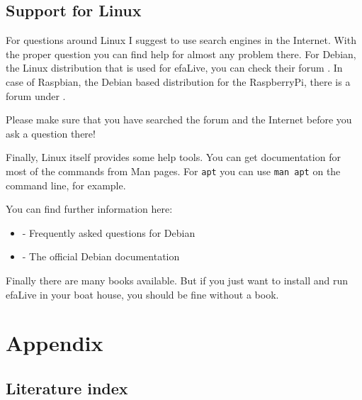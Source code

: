 \documentclass[a4paper,12pt,twoside]{article}
\begin{document}
\subsection{Support for Linux}
\label{support_linux}
For questions around Linux I suggest to use search engines in the
Internet. With the proper question you can find help for almost any
problem there. For Debian, the Linux distribution that is used for
efaLive, you can check their forum \cite{HLP1}. In case of Raspbian, 
the Debian based distribution for the RaspberryPi, there is a forum 
under \cite{RSP1}.

Please make sure that
you have searched the forum and the Internet before you ask a question
there!

Finally, Linux itself provides some help tools. You can get
documentation for most of the commands from Man pages. For
\texttt{apt} you can use \texttt{man
apt} on the command line, for example.

You can find further information here:

\begin{itemize}
    \item \cite{HLP2} - Frequently asked questions for Debian
    \item \cite{HLP3} - The official Debian documentation
\end{itemize}

Finally there are many books available. But if you just want to install
and run efaLive in your boat house, you should be fine without a book.


\clearpage
\section{Appendix}
\label{sct:appendix}
\subsection{Literature index}
\label{sct:literature}


\end{document}
